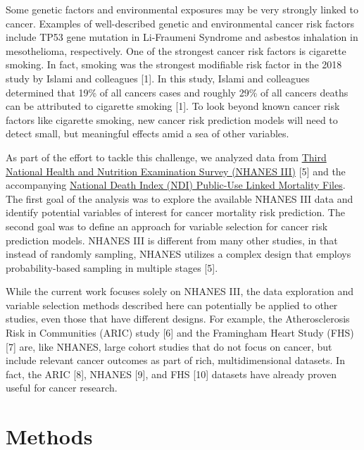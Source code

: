 \documentclass[12pt,oneside]{reedthesis}
\theoremstyle{definition}
\theoremstyle{definition}
\theoremstyle{definition}
\theoremstyle{remark}
\begin{document}
Some genetic factors and environmental exposures may be very strongly
linked to cancer. Examples of well-described genetic and environmental
cancer risk factors include TP53 gene mutation in Li-Fraumeni Syndrome
and asbestos inhalation in mesothelioma, respectively. One of the
strongest cancer risk factors is cigarette smoking. In fact, smoking was
the strongest modifiable risk factor in the 2018 study by Islami and
colleagues {[}1{]}. In this study, Islami and colleagues determined that
19\% of all cancers cases and roughly 29\% of all cancers deaths can be
attributed to cigarette smoking {[}1{]}. To look beyond known cancer
risk factors like cigarette smoking, new cancer risk prediction models
will need to detect small, but meaningful effects amid a sea of other
variables.

As part of the effort to tackle this challenge, we analyzed data from
\href{https://wwwn.cdc.gov/nchs/nhanes/nhanes3/DataFiles.aspx}{Third
National Health and Nutrition Examination Survey (NHANES III)} {[}5{]}
and the accompanying
\href{https://www.cdc.gov/nchs/data-linkage/mortality-public.htm}{National
Death Index (NDI) Public-Use Linked Mortality Files}. The first goal of
the analysis was to explore the available NHANES III data and identify
potential variables of interest for cancer mortality risk prediction.
The second goal was to define an approach for variable selection for
cancer risk prediction models. NHANES III is different from many other
studies, in that instead of randomly sampling, NHANES utilizes a complex
design that employs probability-based sampling in multiple stages
{[}5{]}.

While the current work focuses solely on NHANES III, the data
exploration and variable selection methods described here can
potentially be applied to other studies, even those that have different
designs. For example, the Atherosclerosis Risk in Communities (ARIC)
study {[}6{]} and the Framingham Heart Study (FHS) {[}7{]} are, like
NHANES, large cohort studies that do not focus on cancer, but include
relevant cancer outcomes as part of rich, multidimensional datasets. In
fact, the ARIC {[}8{]}, NHANES {[}9{]}, and FHS {[}10{]} datasets have
already proven useful for cancer research.

\hypertarget{methods}{%
\section*{Methods}\label{methods}}
\end{document}
